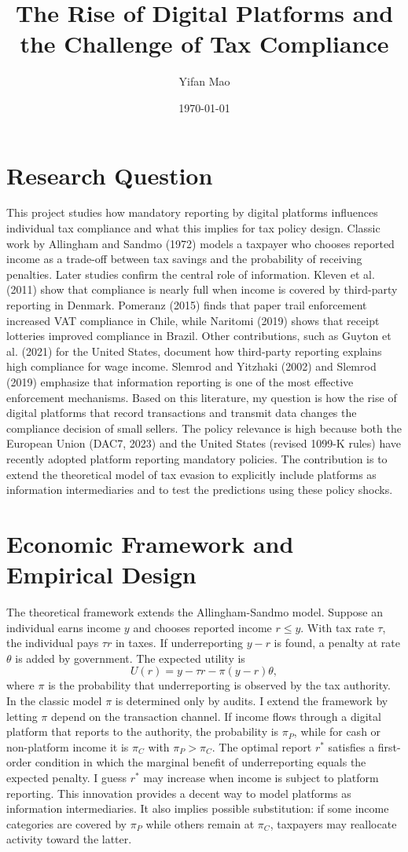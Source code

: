 \documentclass[11pt]{article}
\title{The Rise of Digital Platforms and the Challenge of Tax Compliance}
\author{Yifan Mao}
\date{\today}
\begin{document}
\maketitle

\section*{Research Question}
This project studies how mandatory reporting by digital platforms influences individual tax compliance and what this implies for tax policy design. Classic work by Allingham and Sandmo (1972) models a taxpayer who chooses reported income as a trade-off between tax savings and the probability of receiving penalties. Later studies confirm the central role of information. Kleven et al. (2011) show that compliance is nearly full when income is covered by third-party reporting in Denmark. Pomeranz (2015) finds that paper trail enforcement increased VAT compliance in Chile, while Naritomi (2019) shows that receipt lotteries improved compliance in Brazil. Other contributions, such as Guyton et al. (2021) for the United States, document how third-party reporting explains high compliance for wage income. Slemrod and Yitzhaki (2002) and Slemrod (2019) emphasize that information reporting is one of the most effective enforcement mechanisms. Based on this literature, my question is how the rise of digital platforms that record transactions and transmit data changes the compliance decision of small sellers. The policy relevance is high because both the European Union (DAC7, 2023) and the United States (revised 1099-K rules) have recently adopted platform reporting mandatory policies. The contribution is to extend the theoretical model of tax evasion to explicitly include platforms as information intermediaries and to test the predictions using these policy shocks.

\section*{Economic Framework and Empirical Design}
The theoretical framework extends the Allingham-Sandmo model. Suppose an individual earns income $y$ and chooses reported income $r \leq y$. With tax rate $\tau$, the individual pays $\tau r$ in taxes. If underreporting $y-r$ is found, a penalty at rate $\theta$ is added by government. The expected utility is
\[
U(r) = y - \tau r - \pi(y-r)\theta,
\]
where $\pi$ is the probability that underreporting is observed by the tax authority. In the classic model $\pi$ is determined only by audits. I extend the framework by letting $\pi$ depend on the transaction channel. If income flows through a digital platform that reports to the authority, the probability is $\pi_P$, while for cash or non-platform income it is $\pi_C$ with $\pi_P > \pi_C$. The optimal report $r^\ast$ satisfies a first-order condition in which the marginal benefit of underreporting equals the expected penalty. I guess $r^\ast$ may increase when income is subject to platform reporting. This innovation provides a decent way to model platforms as information intermediaries. It also implies possible substitution: if some income categories are covered by $\pi_P$ while others remain at $\pi_C$, taxpayers may reallocate activity toward the latter.
\end{document}
